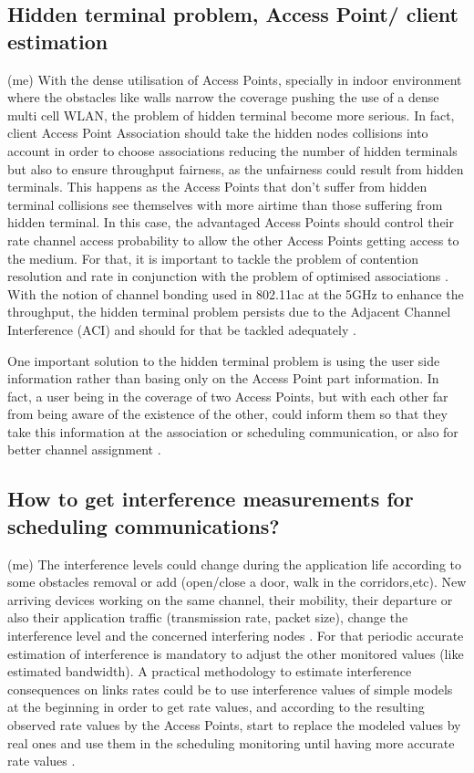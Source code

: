 \documentclass[journal,transmag]{IEEEtran}
\begin{document}
\subsection{Hidden terminal problem, Access Point/ client estimation} (me)
With the dense utilisation of Access Points, specially in indoor environment where the obstacles like walls narrow the coverage pushing the use of a dense multi cell WLAN, the problem of hidden terminal become more serious. In fact, client Access Point Association should take the hidden nodes collisions into account in order to choose associations reducing the number of hidden terminals but also to ensure throughput fairness, as the unfairness could result from hidden terminals. This happens as the Access Points that don't suffer from hidden terminal collisions see themselves with more airtime than those suffering from hidden terminal. In this case, the advantaged Access Points should control their rate channel access probability to allow the other Access Points getting access to the medium. For that, it is important to tackle the problem of contention resolution and rate in conjunction with the problem of optimised associations \cite{14throughput_optimisation_AP_association_interefrence}. With the notion of channel bonding used in 802.11ac at the 5GHz to enhance the throughput, the hidden terminal problem persists due to the Adjacent Channel Interference (ACI) and should for that be tackled adequately \cite{16channel_measurment_AP_selection}. 

One important solution to the hidden terminal problem is using the user side information rather than basing only on the Access Point part information. In fact, a user being in the coverage of two Access Points, but with each other far from being aware of the existence of the other, could inform them so that they take this information at the association or scheduling communication, or also for better channel assignment \cite{06client_channel_WLAN}. 

\subsection{How to get interference measurements for scheduling communications?} (me)
The interference levels could change during the application life according to some obstacles removal or add (open/close a door, walk in the corridors,etc). New arriving devices working on the same channel, their mobility, their departure or also their application traffic (transmission rate, packet size), change the interference level and the concerned interfering nodes \cite{11PIE_sky}. For that periodic accurate estimation of interference is mandatory to adjust the other monitored values (like estimated bandwidth). A practical methodology to estimate interference consequences on links rates could be to use interference values of simple models at the beginning in order to get rate values, and according to the resulting observed rate values by the Access Points, start to replace the modeled values by real ones and use them in the scheduling monitoring until having more accurate rate values \cite{14interference_fairness_infocom}.    
\end{document}
